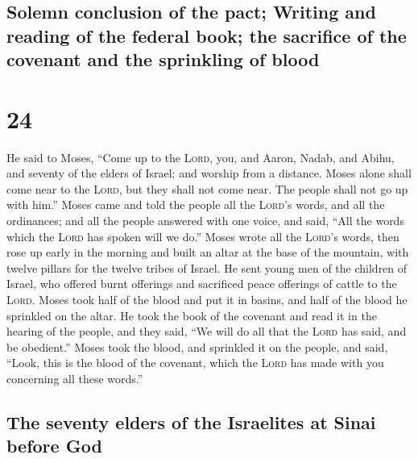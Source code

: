 \hypertarget{solemn-conclusion-of-the-pact-writing-and-reading-of-the-federal-book-the-sacrifice-of-the-covenant-and-the-sprinkling-of-blood}{%
\subsection{Solemn conclusion of the pact; Writing and reading of the
federal book; the sacrifice of the covenant and the sprinkling of
blood}\label{solemn-conclusion-of-the-pact-writing-and-reading-of-the-federal-book-the-sacrifice-of-the-covenant-and-the-sprinkling-of-blood}}

\hypertarget{section-23}{%
\section{24}\label{section-23}}

 He said to Moses, ``Come up to the \textsc{Lord}, you,
and Aaron, Nadab, and Abihu, and seventy of the elders of Israel; and
worship from a distance.  Moses alone shall come near to
the \textsc{Lord}, but they shall not come near. The people shall not go
up with him.''  Moses came and told the people all the
\textsc{Lord}'s words, and all the ordinances; and all the people
answered with one voice, and said, ``All the words which the
\textsc{Lord} has spoken will we do.''  Moses wrote all
the \textsc{Lord}'s words, then rose up early in the morning and built
an altar at the base of the mountain, with twelve pillars for the twelve
tribes of Israel.  He sent young men of the children of
Israel, who offered burnt offerings and sacrificed peace offerings of
cattle to the \textsc{Lord}.  Moses took half of the blood
and put it in basins, and half of the blood he sprinkled on the altar.
 He took the book of the covenant and read it in the
hearing of the people, and they said, ``We will do all that the
\textsc{Lord} has said, and be obedient.''  Moses took the
blood, and sprinkled it on the people, and said, ``Look, this is the
blood of the covenant, which the \textsc{Lord} has made with you
concerning all these words.''

\hypertarget{the-seventy-elders-of-the-israelites-at-sinai-before-god}{%
\subsection{The seventy elders of the Israelites at Sinai before
God}\label{the-seventy-elders-of-the-israelites-at-sinai-before-god}}

